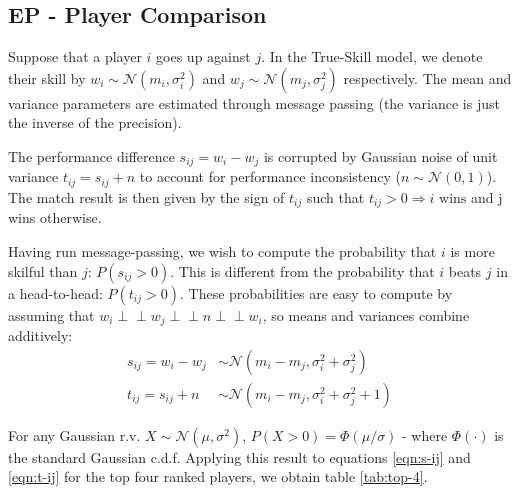 \documentclass[]{article}
\newcommand{\Ncal}{\mathcal{N}}
\newcommand{\indep}{\perp \!\!\! \perp}
\begin{document}
\clearpage
\subsection{EP - Player Comparison}

Suppose that a player $i$ goes up against $j$. In the True-Skill model, we denote their skill by $w_i \sim \Ncal(m_i, \sigma_i^2)$ and $w_j \sim \Ncal(m_j, \sigma_j^2)$ respectively. The mean and variance parameters are estimated through message passing (the variance is just the inverse of the precision). 

The performance difference $s_{ij} = w_i - w_j$ is corrupted by Gaussian noise of unit variance $t_{ij} = s_{ij} + n$ to account for performance inconsistency ($n \sim \Ncal(0, 1)$). The match result is then given by the sign of $t_{ij}$ such that $t_{ij} > 0 \Rightarrow i \text{ wins}$ and j wins otherwise.

Having run message-passing, we wish to compute the probability that $i$ is more skilful than $j$: $P(s_{ij} > 0)$. This is different from the probability that $i$ beats $j$ in a head-to-head: $P(t_{ij} > 0)$. These probabilities are easy to compute by assuming that $w_i \indep w_j \indep n \indep w_i$, so means and variances combine additively:
%
\begin{align}
		s_{ij} = w_i - w_j &\sim \Ncal(m_i - m_j, \sigma_i^2 + \sigma_j^2)
		\label{eqn:s-ij} \\	
		t_{ij} = s_{ij} + n &\sim \Ncal(m_i - m_j, \sigma_i^2 + \sigma_j^2 + 1)
		\label{eqn:t-ij}
\end{align}

For any Gaussian r.v. $X \sim \Ncal(\mu, \sigma^2)$, $P(X > 0) = \Phi(\mu / \sigma)$ - where $\Phi(\cdot)$ is the standard Gaussian c.d.f. Applying this result to equations \ref{eqn:s-ij} and \ref{eqn:t-ij} for the top four ranked players, we obtain table \ref{tab:top-4}.
\end{document}
